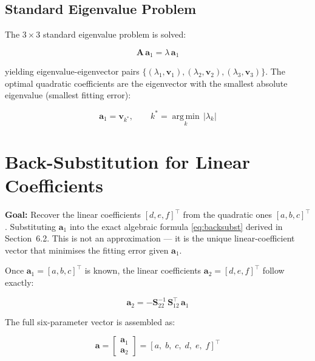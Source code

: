 \documentclass{article}
\begin{document}
	\subsection{Standard Eigenvalue Problem}
	
	The $3\times3$ standard eigenvalue problem is solved:
	
	\begin{equation}
		\mathbf{A}\,\mathbf{a}_1 = \lambda\,\mathbf{a}_1
	\end{equation}
	
	yielding eigenvalue-eigenvector pairs
	$\{(\lambda_1, \mathbf{v}_1),(\lambda_2, \mathbf{v}_2),
	(\lambda_3, \mathbf{v}_3)\}$.
	The optimal quadratic coefficients are the eigenvector
	with the smallest absolute eigenvalue (smallest fitting error):
	
	\begin{equation}
		\mathbf{a}_1 = \mathbf{v}_{k^*}, \qquad
		k^* = \operatorname*{arg\,min}_{k}\, |\lambda_k|
	\end{equation}
	

	\section{Back-Substitution for Linear Coefficients}
	
	
	\textbf{Goal:} Recover the linear coefficients $[d,e,f]^\top$
	from the quadratic ones $[a,b,c]^\top$.
	Substituting $\mathbf{a}_1$ into the exact
	algebraic formula \eqref{eq:backsubst} derived in
	Section~6.2.
	This is not an approximation --- it is the unique
	linear-coefficient vector that minimises the fitting error
	given $\mathbf{a}_1$.
	
	Once $\mathbf{a}_1 = [a, b, c]^\top$ is known, the linear
	coefficients $\mathbf{a}_2 = [d, e, f]^\top$ follow exactly:
	
	\begin{equation}
		\mathbf{a}_2 = -\mathbf{S}_{22}^{-1}\,\mathbf{S}_{12}^\top\,\mathbf{a}_1
	\end{equation}
	
	The full six-parameter vector is assembled as:
	
	\begin{equation}
		\mathbf{a} =
		\begin{bmatrix} \mathbf{a}_1 \\ \mathbf{a}_2 \end{bmatrix}
		= [a,\; b,\; c,\; d,\; e,\; f]^\top
	\end{equation}
	
\end{document}
